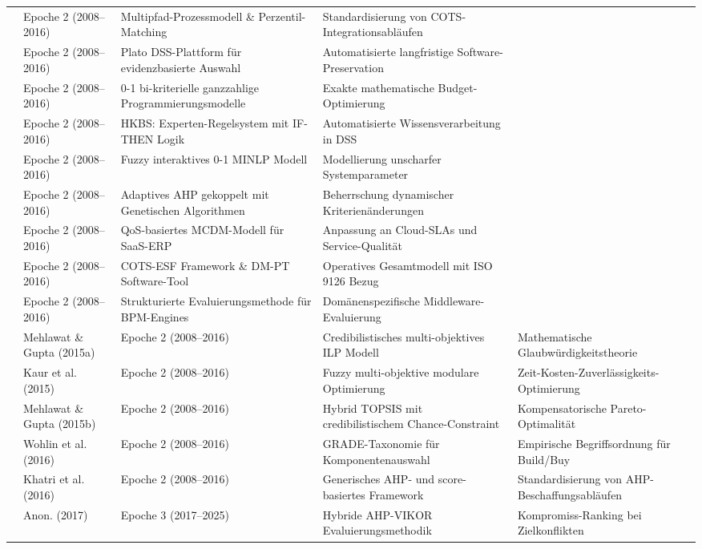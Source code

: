 \begin{longtable}{p{} p{} p{} p{} p{}}
\cite{WBGP3ETU} & Epoche 2 (2008--2016) & Multipfad-Prozessmodell \& Perzentil-Matching & Standardisierung von COTS-Integrationsabläufen \\
\cite{8VHUMEKY} & Epoche 2 (2008--2016) & Plato DSS-Plattform für evidenzbasierte Auswahl & Automatisierte langfristige Software-Preservation \\
\cite{VUVLUN85} & Epoche 2 (2008--2016) & 0-1 bi-kriterielle ganzzahlige Programmierungsmodelle & Exakte mathematische Budget-Optimierung \\
\cite{U4E7VXQU} & Epoche 2 (2008--2016) & HKBS: Experten-Regelsystem mit IF-THEN Logik & Automatisierte Wissensverarbeitung in DSS \\
\cite{6YJHIVHG} & Epoche 2 (2008--2016) & Fuzzy interaktives 0-1 MINLP Modell & Modellierung unscharfer Systemparameter \\
\cite{VRTXHQI7} & Epoche 2 (2008--2016) & Adaptives AHP gekoppelt mit Genetischen Algorithmen & Beherrschung dynamischer Kriterienänderungen \\
\cite{W8P543Y2} & Epoche 2 (2008--2016) & QoS-basiertes MCDM-Modell für SaaS-ERP & Anpassung an Cloud-SLAs und Service-Qualität \\
\cite{WZM7DUBY} & Epoche 2 (2008--2016) & COTS-ESF Framework \& DM-PT Software-Tool & Operatives Gesamtmodell mit ISO 9126 Bezug \\
\cite{LYMHTPXS} & Epoche 2 (2008--2016) & Strukturierte Evaluierungsmethode für BPM-Engines & Domänenspezifische Middleware-Evaluierung \\
\cite{JX4RDRDU} & Mehlawat \& Gupta (2015a) & Epoche 2 (2008--2016) & Credibilistisches multi-objektives ILP Modell & Mathematische Glaubwürdigkeitstheorie \\
\cite{P9SATBH5} & Kaur et al. (2015) & Epoche 2 (2008--2016) & Fuzzy multi-objektive modulare Optimierung & Zeit-Kosten-Zuverlässigkeits-Optimierung \\
\cite{B7ZTQCZZ} & Mehlawat \& Gupta (2015b) & Epoche 2 (2008--2016) & Hybrid TOPSIS mit credibilistischem Chance-Constraint & Kompensatorische Pareto-Optimalität \\
\cite{JT5X3FIG} & Wohlin et al. (2016) & Epoche 2 (2008--2016) & GRADE-Taxonomie für Komponentenauswahl & Empirische Begriffsordnung für Build/Buy \\
\cite{DFASRUVC} & Khatri et al. (2016) & Epoche 2 (2008--2016) & Generisches AHP- und score-basiertes Framework & Standardisierung von AHP-Beschaffungsabläufen \\
\cite{QNWK8SAP} & Anon. (2017) & Epoche 3 (2017--2025) & Hybride AHP-VIKOR Evaluierungsmethodik & Kompromiss-Ranking bei Zielkonflikten \\

\end{longtable}
